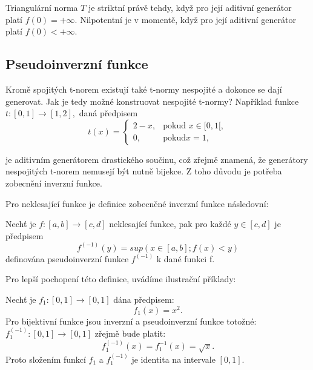 \begin{remark}
    Triangul\'arn\'i norma $T$ je striktní právě tehdy, když pro její aditivní generátor platí $f(0) = +\infty$. Nilpotentní je v momentě, když pro  její aditivní generátor platí $f(0) < +\infty$.
\end{remark}
\subsection{Pseudoinverzn\'i funkce}

Krom\v e   spojit\'ych t-norem existuj\'i tak\'e t-normy nespojit\'e a dokonce se daj\'i generovat. Jak je tedy možné konstruovat nespojité t-normy? Například funkce $t: [0,1] \rightarrow [1,2],$ daná předpisem $$t(x)= \begin{cases} 2-x, & \mbox {pokud }x \in [0,1[,
    \\ 0, & \mbox {pokud} x = 1,
    \end{cases}$$
    
    je aditivním generátorem drastického součinu, což zřejmě znamená, že generátory nespojitých t-norem nemusejí být nutně bijekce. Z toho d\r uvodu je potřeba zobecnění inverzní funkce.

      Pro neklesající  funkce je definice zobecn\v en\'e inverzn\'i funkce n\'asledovn\'i:
\begin{definition}
    \cite{hlinena}
    Nech\v t je $f:[a,b] \rightarrow [c,d]$ neklesající funkce, pak pro každé $y \in [c,d]$ je předpisem $$f^{(-1)}(y) = sup(x \in [a,b];f(x)<y)$$
    definována pseudoinverzní funkce $f^{(-1)}$ k dané funkci f.
\end{definition}

Pro lep\v s\'i pochopen\'i t\'eto definice, uv\'ad\'ime ilustra\v cn\'i p\v r\'iklady:

\begin{example} 
    Nech\v t je  $f_1:[0,1] \rightarrow [0,1]$  dána předpisem:
    $$f_1(x)=x^2.$$
   Pro bijektivn\'i funkce jsou inverzn\'i a pseudoinverzn\'i funkce toto\v zn\'e: \newline$f_1^{(-1)}:[0,1] \rightarrow [0,1]$ zřejmě bude platit:
    $$f_1^{(-1)}(x)=f_1^{-1}(x)= \sqrt{x}.$$
    Proto složením funkcí $f_1$ a $f_1^{(-1)}$ je
    identita na intervale $[0,1].$
\end{example} 

